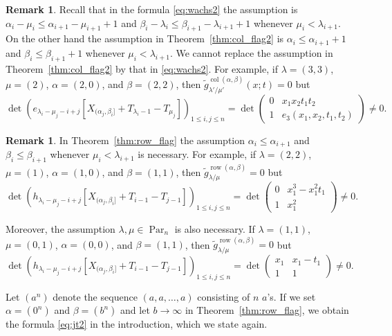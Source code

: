 \documentclass[12pt]{amsart}
\numberwithin{equation}{section}
\theoremstyle{definition}
\newtheorem{remark}[thm]{Remark}
\newcommand\wg{\widetilde{g}}
\newcommand\col{\operatorname{col}}
\newcommand\row{\operatorname{row}}
\newcommand\Par{\operatorname{Par}}
\begin{document}
\begin{remark}\label{rem:wachs}
  Recall that in the formula \eqref{eq:wachs2} the assumption is
  $\alpha_i-\mu_i\le \alpha_{i+1}-\mu_{i+1}+1$ and $\beta_i-\lambda_i\le
  \beta_{i+1}-\lambda_{i+1}+1$ whenever $\mu_i<\lambda_{i+1}$. On the other hand
  the assumption in Theorem~\ref{thm:col_flag2} is $\alpha_i\le \alpha_{i+1}+1$
  and $\beta_i\le \beta_{i+1}+1$ whenever $\mu_i<\lambda_{i+1}$. We cannot replace
  the assumption in Theorem~\ref{thm:col_flag2} by that in \eqref{eq:wachs2}.
  For example, if $\lambda=(3,3)$, $\mu=(2)$, $\alpha=(2,0)$, and $\beta=(2,2)$,
  then $\wg_{\lambda'/\mu'}^{\col(\alpha,\beta)}(x;t)=0$ but
 \[
 \det \left(
    e_{\lambda_i-\mu_j-i+j}[X_{(\alpha_j,\beta_i]}+T_{\lambda_i-1}-T_{\mu_j}]
  \right)_{1\le i,j\le n} = \det
   \begin{pmatrix}
0 & x_1x_2t_1t_2 \\
1 & e_3(x_1,x_2,t_1,t_2)
   \end{pmatrix} \ne 0.
 \]
\end{remark}

\begin{remark}
  In Theorem~\ref{thm:row_flag} the assumption $\alpha_i\le \alpha_{i+1}$ and
  $\beta_i\le \beta_{i+1}$ whenever $\mu_i<\lambda_{i+1}$ is necessary. For
  example, if $\lambda=(2,2)$, $\mu=(1)$, $\alpha=(1,0)$, and $\beta=(1,1)$,
  then $\wg_{\lambda/\mu}^{\row(\alpha,\beta)}=0$ but
 \[
   \det \left(
     h_{\lambda_i-\mu_j-i+j}[X_{(\alpha_j,\beta_i]}+T_{i-1}-T_{j-1}]
      \right)_{1\le i,j\le n} = \det
   \begin{pmatrix}
0 & x_{1}^{3} - x_{1}^{2} t_{1} \\
1 & x_1^2
   \end{pmatrix} \ne 0.
 \]

 Moreover, the assumption $\lambda,\mu\in\Par_n$ is also necessary. If
 $\lambda=(1,1)$, $\mu=(0,1)$, $\alpha=(0,0)$, and $\beta=(1,1)$, then
 $\wg_{\lambda/\mu}^{\row(\alpha,\beta)}=0$ but
 \[
   \det \left(
     h_{\lambda_i-\mu_j-i+j}[X_{(\alpha_j,\beta_i]}+T_{i-1}-T_{j-1}]
      \right)_{1\le i,j\le n} = \det
   \begin{pmatrix}
x_1 & x_{1} - t_{1} \\
1 & 1
   \end{pmatrix} \ne 0.
 \]
\end{remark}

Let $(a^n)$ denote the sequence $(a,a,\dots,a)$ consisting of $n$ $a$'s. If we
set $\alpha=(0^n)$ and $\beta=(b^n)$ and let $b\to\infty$ in
Theorem~\ref{thm:row_flag}, we obtain the formula \eqref{eq:jt2} in the
introduction, which we state again.
\end{document}
